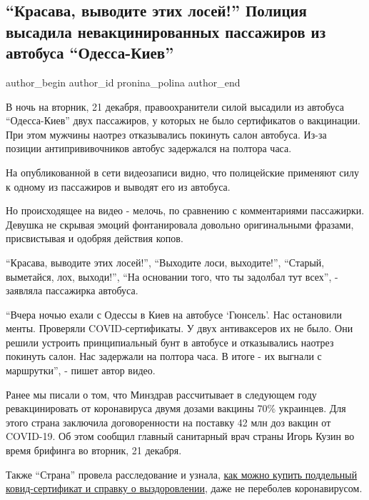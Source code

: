  
 
 
 
 
\subsection{\enquote{Красава, выводите этих лосей!} Полиция высадила невакцинированных пассажиров из автобуса \enquote{Одесса-Киев}}
\label{sec:22_12_2021.stz.news.ua.strana.1.krasava_losi_avtobus}

\ifcmt
 author_begin
   author_id pronina_polina
 author_end
\fi

В ночь на вторник, 21 декабря, правоохранители силой высадили из автобуса
\enquote{Одесса-Киев} двух пассажиров, у которых не было сертификатов о вакцинации. При
этом мужчины наотрез отказывались покинуть салон автобуса. Из-за позиции
антипрививочников автобус задержался на полтора часа.


На опубликованной в сети видеозаписи видно, что полицейские применяют силу к
одному из пассажиров и выводят его из автобуса.

Но происходящее на видео - мелочь, по сравнению с комментариями пассажирки.
Девушка не скрывая эмоций фонтанировала довольно оригинальными фразами,
присвистывая и одобряя действия копов.

\enquote{Красава, выводите этих лосей!}, \enquote{Выходите лоси, выходите!}, \enquote{Старый,
выметайся, лох, выходи!}, \enquote{На основании того, что ты задолбал тут всех}, -
заявляла пассажирка автобуса. 

\enquote{Вчера ночью ехали с Одессы в Киев на автобусе \enquote{Гюнсель}. Нас остановили менты.
Проверяли COVID-сертификаты. У двух антиваксеров их не было. Они решили
устроить принципиальный бунт в автобусе и отказывались наотрез покинуть салон.
Нас задержали на полтора часа. В итоге - их выгнали с маршрутки}, - пишет автор
видео.

Ранее мы писали о том, что Минздрав рассчитывает в следующем году
ревакцинировать от коронавируса двумя дозами вакцины 70\% украинцев. Для этого
страна заключила договоренности на поставку 42 млн доз вакцин от COVID-19. Об
этом сообщил главный санитарный врач страны Игорь Кузин во время брифинга во
вторник, 21 декабря.

Также \enquote{Страна} провела расследование и узнала, \href{https://strana.news/articles/rassledovania/367606-kak-kupit-poddelnyj-kovid-pasport-i-spravku-o-vyzdorovlenii-ot-kovida-ne-perebolev-im.html}{как можно купить поддельный
ковид-сертификат и справку о выздоровлении}, даже не переболев коронавирусом.
